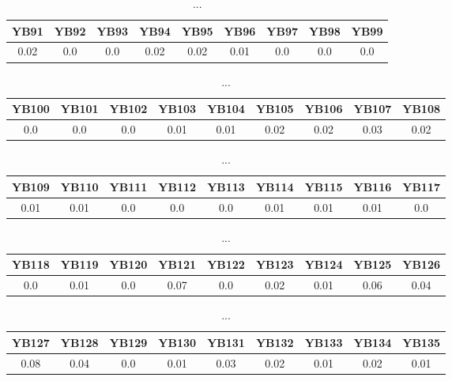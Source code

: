 \documentclass[]{article}
\begin{document}
\begin{table}[h]
      \centering
      \begin{tabular}{|c|c|c|c|c|c|c|c|c|}
            \hline
            YB91 & YB92 & YB93 & YB94 & YB95 & YB96 & YB97 & YB98 & YB99 \\
            \hline
            0.02 & 0.0  & 0.0  & 0.02 & 0.02 & 0.01 & 0.0  & 0.0  & 0.0  \\
            \hline
      \end{tabular}
      \caption{...}
\end{table}
\begin{table}[h]
      \centering
      \begin{tabular}{|c|c|c|c|c|c|c|c|c|}
            \hline
            YB100 & YB101 & YB102 & YB103 & YB104 & YB105 & YB106 & YB107 & YB108 \\
            \hline
            0.0   & 0.0   & 0.0   & 0.01  & 0.01  & 0.02  & 0.02  & 0.03  & 0.02  \\
            \hline
      \end{tabular}
      \caption{...}
\end{table}
\begin{table}[h]
      \centering
      \begin{tabular}{|c|c|c|c|c|c|c|c|c|}
            \hline
            YB109 & YB110 & YB111 & YB112 & YB113 & YB114 & YB115 & YB116 & YB117 \\
            \hline
            0.01  & 0.01  & 0.0   & 0.0   & 0.0   & 0.01  & 0.01  & 0.01  & 0.0   \\
            \hline
      \end{tabular}
      \caption{...}
\end{table}
\begin{table}[h]
      \centering
      \begin{tabular}{|c|c|c|c|c|c|c|c|c|}
            \hline
            YB118 & YB119 & YB120 & YB121 & YB122 & YB123 & YB124 & YB125 & YB126 \\
            \hline
            0.0   & 0.01  & 0.0   & 0.07  & 0.0   & 0.02  & 0.01  & 0.06  & 0.04  \\
            \hline
      \end{tabular}
      \caption{...}
\end{table}
\begin{table}[h]
      \centering
      \begin{tabular}{|c|c|c|c|c|c|c|c|c|}
            \hline
            YB127 & YB128 & YB129 & YB130 & YB131 & YB132 & YB133 & YB134 & YB135 \\
            \hline
            0.08  & 0.04  & 0.0   & 0.01  & 0.03  & 0.02  & 0.01  & 0.02  & 0.01  \\
            \hline
      \end{tabular}
      \caption{...}
\end{table}
\end{document}
